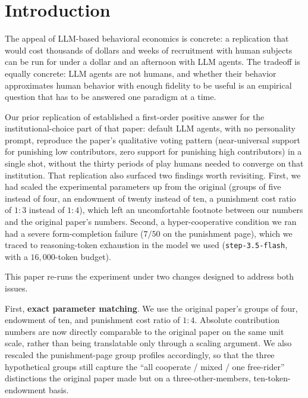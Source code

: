 \documentclass[12pt, a4paper]{article}
\begin{document}
\section{Introduction}

The appeal of LLM-based behavioral economics is concrete: a replication that would cost thousands of dollars and weeks of recruitment with human subjects can be run for under a dollar and an afternoon with LLM agents. The tradeoff is equally concrete: LLM agents are not humans, and whether their behavior approximates human behavior with enough fidelity to be useful is an empirical question that has to be answered one paradigm at a time.

Our prior replication \citep{gul2026who} of \citet{ertan2009who} established a first-order positive answer for the institutional-choice part of that paper: default LLM agents, with no personality prompt, reproduce the paper's qualitative voting pattern (near-universal support for punishing low contributors, zero support for punishing high contributors) in a single shot, without the thirty periods of play humans needed to converge on that institution. That replication also surfaced two findings worth revisiting. First, we had scaled the experimental parameters up from the original (groups of five instead of four, an endowment of twenty instead of ten, a punishment cost ratio of $1{:}3$ instead of $1{:}4$), which left an uncomfortable footnote between our numbers and the original paper's numbers. Second, a hyper-cooperative condition we ran had a severe form-completion failure ($7/50$ on the punishment page), which we traced to reasoning-token exhaustion in the model we used (\texttt{step-3.5-flash}, with a $16{,}000$-token budget).

This paper re-runs the experiment under two changes designed to address both issues.

First, \textbf{exact parameter matching}. We use the original paper's groups of four, endowment of ten, and punishment cost ratio of $1{:}4$. Absolute contribution numbers are now directly comparable to the original paper on the same unit scale, rather than being translatable only through a scaling argument. We also rescaled the punishment-page group profiles accordingly, so that the three hypothetical groups still capture the ``all cooperate / mixed / one free-rider'' distinctions the original paper made but on a three-other-members, ten-token-endowment basis.
\end{document}

